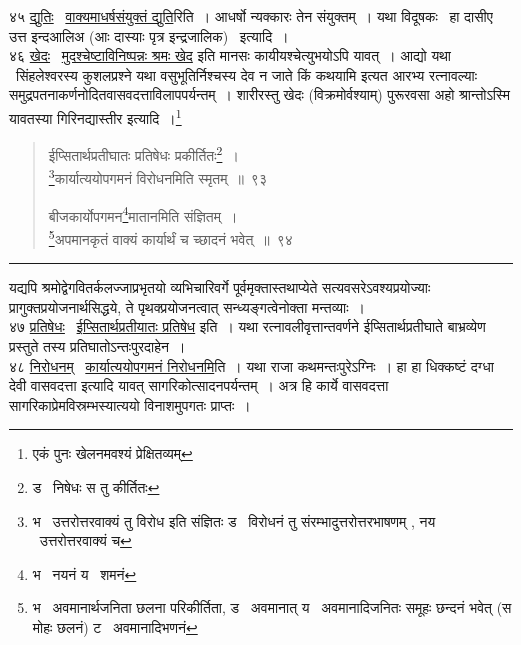 \documentclass[11pt, openany]{book}
\begin{document}
४५ \underline{द्युतिः} \textendash\ \underline{वाक्यमाधर्षसंयुक्तं द्युति}रिति~। आधर्षो न्यक्कारः तेन संयुक्तम्~। यथा विदूषकः \textendash\ हा दासीए उत्त इन्दआलिअ (आः दास्याः पृत्र इन्द्रजालिक) \textendash\ इत्यादि~।\\

४६ \underline{खेदः} \textendash\ \underline{मुदश्चेष्टाविनिष्पन्नः श्रमः खेद} इति मानसः कायीयश्चेत्युभयोऽपि यावत्~। आद्यो यथा \textendash\ सिंहलेश्वरस्य कुशलप्रश्ने यथा वसुभूतिर्निश्चस्य {\qt देव न जाते किं कथयामि} इत्यत आरभ्य रत्नावल्याः समुद्रपतनाकर्णनोदितवासवदत्ताविलापपर्यन्तम्~। शारीरस्तु खेदः (विक्रमोर्वश्याम्) पुरूरवसा {\qt अहो श्रान्तोऽस्मि यावतस्या गिरिनद्यास्तीर} इत्यादि~।\renewcommand{\thefootnote}{*}\footnote{एकं पुनः खेलनमवश्यं प्रेक्षितव्यम्}

\newpage

\begin{quote}
{\na ईप्सितार्थप्रतीघातः प्रतिषेधः प्रकीर्तितः\renewcommand{\thefootnote}{1}\footnote{ड \textendash\ निषेधः स तु कीर्तितः}~।\\
\renewcommand{\thefootnote}{2}\footnote{भ \textendash\ उत्तरोत्तरवाक्यं तु विरोध इति संज्ञितः ड \textendash\ विरोधनं तु संरम्भादुत्तरोत्तरभाषणम् , नय \textendash\ उत्तरोत्तरवाक्यं च}कार्यात्ययोपगमनं विरोधनमिति स्मृतम्~॥~९३

बीजकार्योपगमन\renewcommand{\thefootnote}{3}\footnote{भ \textendash\ नयनं य \textendash\ शमनं}मातानमिति संज्ञितम्~।\\
\renewcommand{\thefootnote}{4}\footnote{भ \textendash\ अवमानार्थजनिता छलना परिकीर्तिता, ड \textendash\ अवमानात् य \textendash\ अवमानादिजनितः समूहः छन्दनं भवेत् (स मोहः छलनं) ट \textendash\ अवमानादिभणनं}अपमानकृतं वाक्यं कार्यार्थं च च्छादनं भवेत्~॥~९४}
\end{quote}

\hrule

\vspace{2mm}
यद्यपि श्रमोद्वेगवितर्कलज्जाप्रभृतयो व्यभिचारिवर्गे पूर्वमृक्तास्तथाप्येते सत्यवसरेऽवश्यप्रयोज्याः प्रागुक्तप्रयोजनार्थसिद्धये, ते पृथक्प्रयोजनत्वात् सन्ध्यङ्गत्वेनोक्ता मन्तव्याः~।\\

४७ \underline{प्रतिषेधः} \textendash\ \underline{ईप्सितार्थप्रतीयातः प्रतिषेध} इति~। यथा रत्नावलीवृत्तान्तवर्णने ईप्सितार्थप्रतीघाते बाभ्रव्येण प्रस्तुते तस्य प्रतिघातोऽन्तःपुरदाहेन~।\\

४८ \underline{निरोधनम्} \textendash\ \underline{कार्यात्ययोपगमनं निरोधनमि}ति~। यथा राजा {\qt कथमन्तःपुरेऽग्निः~। हा हा धिक्कष्टं दग्धा देवी वासवदत्ता} इत्यादि यावत् सागरिकोत्सादनपर्यन्तम्~। अत्र हि कार्ये वासवदत्ता सागरिकाप्रेमविस्रम्भस्यात्ययो विनाशमुपगतः प्राप्तः~।\\
\end{document}
